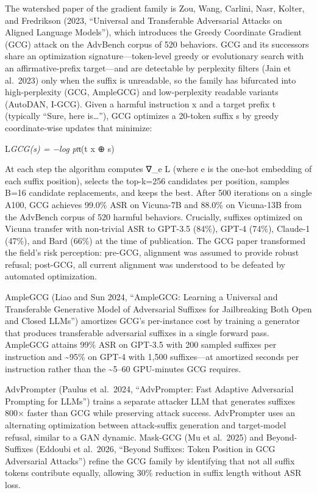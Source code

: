 The watershed paper of the gradient family is Zou, Wang, Carlini, Nasr, Kolter, and Fredrikson (2023, ``Universal and Transferable Adversarial Attacks on Aligned Language Models''), which introduces the Greedy Coordinate Gradient (GCG) attack on the AdvBench corpus of 520 behaviors. GCG and its successors share an optimization signature---token-level greedy or evolutionary search with an affirmative-prefix target---and are detectable by perplexity filters (Jain et al.~2023) only when the suffix is unreadable, so the family has bifurcated into high-perplexity (GCG, AmpleGCG) and low-perplexity readable variants (AutoDAN, I-GCG). Given a harmful instruction x and a target prefix t (typically ``Sure, here is\ldots{}''), GCG optimizes a 20-token suffix s by greedy coordinate-wise updates that minimize:

L\emph{GCG(s) = −log p}π(t \textbar{} x ⊕ s)

At each step the algorithm computes ∇\_e L (where e is the one-hot embedding of each suffix position), selects the top-k=256 candidates per position, samples B=16 candidate replacements, and keeps the best. After 500 iterations on a single A100, GCG achieves 99.0\% ASR on Vicuna-7B and 88.0\% on Vicuna-13B from the AdvBench corpus of 520 harmful behaviors. Crucially, suffixes optimized on Vicuna transfer with non-trivial ASR to GPT-3.5 (84\%), GPT-4 (74\%), Claude-1 (47\%), and Bard (66\%) at the time of publication. The GCG paper transformed the field's risk perception: pre-GCG, alignment was assumed to provide robust refusal; post-GCG, all current alignment was understood to be defeated by automated optimization.

AmpleGCG (Liao and Sun 2024, ``AmpleGCG: Learning a Universal and Transferable Generative Model of Adversarial Suffixes for Jailbreaking Both Open and Closed LLMs'') amortizes GCG's per-instance cost by training a generator that produces transferable adversarial suffixes in a single forward pass. AmpleGCG attains 99\% ASR on GPT-3.5 with 200 sampled suffixes per instruction and \textasciitilde95\% on GPT-4 with 1,500 suffixes---at amortized seconds per instruction rather than the \textasciitilde5--60 GPU-minutes GCG requires.

AdvPrompter (Paulus et al.~2024, ``AdvPrompter: Fast Adaptive Adversarial Prompting for LLMs'') trains a separate attacker LLM that generates suffixes 800× faster than GCG while preserving attack success. AdvPrompter uses an alternating optimization between attack-suffix generation and target-model refusal, similar to a GAN dynamic. Mask-GCG (Mu et al.~2025) and Beyond-Suffixes (Eddoubi et al.~2026, ``Beyond Suffixes: Token Position in GCG Adversarial Attacks'') refine the GCG family by identifying that not all suffix tokens contribute equally, allowing 30\% reduction in suffix length without ASR loss.

